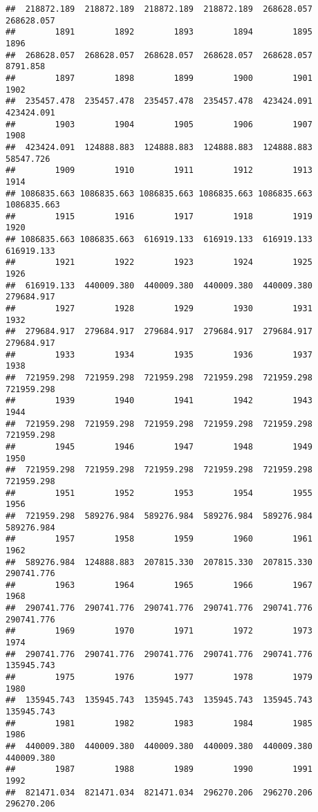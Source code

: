 \documentclass[
]{book}
\begin{document}
\begin{verbatim}
##  218872.189  218872.189  218872.189  218872.189  268628.057  268628.057 
##        1891        1892        1893        1894        1895        1896 
##  268628.057  268628.057  268628.057  268628.057  268628.057    8791.858 
##        1897        1898        1899        1900        1901        1902 
##  235457.478  235457.478  235457.478  235457.478  423424.091  423424.091 
##        1903        1904        1905        1906        1907        1908 
##  423424.091  124888.883  124888.883  124888.883  124888.883   58547.726 
##        1909        1910        1911        1912        1913        1914 
## 1086835.663 1086835.663 1086835.663 1086835.663 1086835.663 1086835.663 
##        1915        1916        1917        1918        1919        1920 
## 1086835.663 1086835.663  616919.133  616919.133  616919.133  616919.133 
##        1921        1922        1923        1924        1925        1926 
##  616919.133  440009.380  440009.380  440009.380  440009.380  279684.917 
##        1927        1928        1929        1930        1931        1932 
##  279684.917  279684.917  279684.917  279684.917  279684.917  279684.917 
##        1933        1934        1935        1936        1937        1938 
##  721959.298  721959.298  721959.298  721959.298  721959.298  721959.298 
##        1939        1940        1941        1942        1943        1944 
##  721959.298  721959.298  721959.298  721959.298  721959.298  721959.298 
##        1945        1946        1947        1948        1949        1950 
##  721959.298  721959.298  721959.298  721959.298  721959.298  721959.298 
##        1951        1952        1953        1954        1955        1956 
##  721959.298  589276.984  589276.984  589276.984  589276.984  589276.984 
##        1957        1958        1959        1960        1961        1962 
##  589276.984  124888.883  207815.330  207815.330  207815.330  290741.776 
##        1963        1964        1965        1966        1967        1968 
##  290741.776  290741.776  290741.776  290741.776  290741.776  290741.776 
##        1969        1970        1971        1972        1973        1974 
##  290741.776  290741.776  290741.776  290741.776  290741.776  135945.743 
##        1975        1976        1977        1978        1979        1980 
##  135945.743  135945.743  135945.743  135945.743  135945.743  135945.743 
##        1981        1982        1983        1984        1985        1986 
##  440009.380  440009.380  440009.380  440009.380  440009.380  440009.380 
##        1987        1988        1989        1990        1991        1992 
##  821471.034  821471.034  821471.034  296270.206  296270.206  296270.206 

\end{verbatim}
\end{document}

